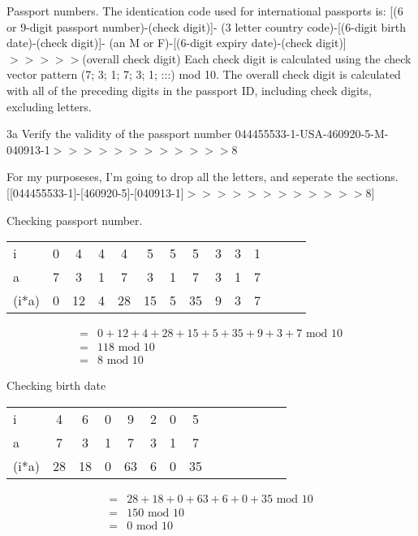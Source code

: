 \begin{question}{3}
Passport numbers. The identication code used for international passports is:
[(6 or 9-digit passport number)-(check digit)]-
(3 letter country code)-[(6-digit birth date)-(check digit)]-
(an M or F)-[(6-digit expiry date)-(check digit)]$>>>>>$(overall check digit)
Each check digit is calculated using the check vector pattern (7; 3; 1; 7; 3; 1; :::) mod 10.
The overall check digit is calculated with all of the preceding digits in the passport ID,
including check digits, excluding letters.
\end{question}


\begin{question}{3a} %
Verify the validity of the passport number
044455533-1-USA-460920-5-M-040913-1$>>>>>>>>>>>>$8

For my purposeses, I'm going to drop all the letters, and seperate the sections.
[[044455533-1]-[460920-5]-[040913-1]$>>>>>>>>>>>>$8]

Checking passport number.

\begin{tabular}{l|ccccccccccccc}
\hline
i     & 0  & 4  & 4  & 4  & 5  & 5  & 5  & 3  & 3  & 1 \\
a     & 7  & 3  & 1  & 7  & 3  & 1  & 7  & 3  & 1  & 7 \\
\hline
(i*a) & 0  & 12 & 4  & 28 & 15 & 5  & 35 & 9  & 3  & 7
\end{tabular}

\begin{align*}
=& 0  + 12 + 4  + 28 + 15 + 5  + 35 + 9  + 3  + 7 \textrm{ mod } 10\\
=& 118 \textrm{ mod } 10\\
=& 8 \textrm{ mod } 10
\end{align*}



Checking birth date

\begin{tabular}{l|ccccccccccccc}
\hline
i     & 4  & 6  & 0  & 9  & 2  & 0  & 5 \\
a     & 7  & 3  & 1  & 7  & 3  & 1  & 7 \\
\hline
(i*a) & 28 & 18 & 0  & 63 & 6  & 0  & 35
\end{tabular}

\begin{align*}
=& 28 + 18 + 0  + 63 + 6  + 0  + 35 \textrm{ mod } 10\\
=& 150 \textrm{ mod } 10\\
=& 0 \textrm{ mod } 10
\end{align*}


\end{question}
